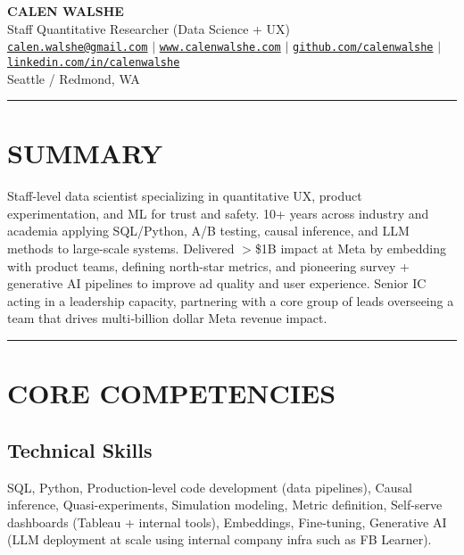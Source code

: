 \documentclass[11pt,a4paper]{article}
\newcommand{\sepline}{\noindent\rule{\textwidth}{0.5pt}\vspace{0.5em}}
\begin{document}
\begin{center}
    {\Huge\bfseries\color{darkblue} CALEN WALSHE}\\[0.3em]
    {\large Staff Quantitative Researcher (Data Science + UX)}\\[0.5em]

    \href{mailto:calen.walshe@gmail.com}{\texttt{calen.walshe@gmail.com}} $\mid$
    \href{https://www.calenwalshe.com}{\texttt{www.calenwalshe.com}} $\mid$
    \href{https://github.com/calenwalshe}{\texttt{github.com/calenwalshe}} $\mid$
    \href{https://linkedin.com/in/calenwalshe}{\texttt{linkedin.com/in/calenwalshe}}\\[0.2em]

    {\color{mediumgray} Seattle / Redmond, WA}
\end{center}

\vspace{0.5em}
\sepline

\section*{SUMMARY}
Staff-level data scientist specializing in quantitative UX, product experimentation, and ML for trust and safety. 10+ years across industry and academia applying SQL/Python, A/B testing, causal inference, and LLM methods to large-scale systems. Delivered $>$\$1B impact at Meta by embedding with product teams, defining north-star metrics, and pioneering survey + generative AI pipelines to improve ad quality and user experience. Senior IC acting in a leadership capacity, partnering with a core group of leads overseeing a team that drives multi‑billion dollar Meta revenue impact.

\vspace{0.5em}
\sepline

\section*{CORE COMPETENCIES}

\subsection*{Technical Skills}
SQL, Python, Production-level code development (data pipelines), Causal inference, Quasi-experiments, Simulation modeling, Metric definition, Self-serve dashboards (Tableau + internal tools), Embeddings, Fine-tuning, Generative AI (LLM deployment at scale using internal company infra such as FB Learner).
\end{document}
